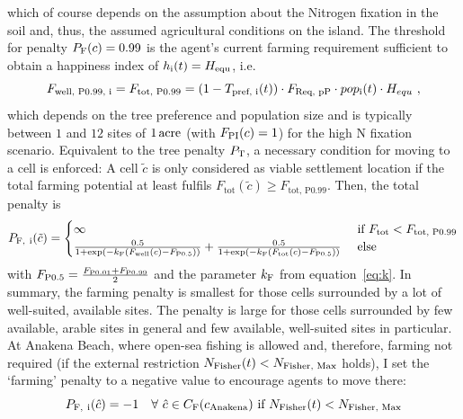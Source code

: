 which of course depends on the assumption about the Nitrogen fixation in the soil and, thus, the assumed agricultural conditions on the island.
The threshold for penalty $P_{\rm F}(c)=0.99$ is the agent's current farming requirement sufficient to obtain a happiness index of $h_{\rm i}(t) = H_{\rm equ}$, i.e.\
\begin{equation} 
F_\text{well, P0.99, i} = F_\text{tot, P0.99} = (1-T_\text{pref, i}(t))\cdot F_\text{Req, pP}\cdot pop_{\rm i}(t) \cdot H_{equ} \ , 
\end{equation}
which depends on the tree preference and population size and is typically between $1$ and $12$ sites of $1\, {\rm acre}$ (with $F_{\rm PI}(c)=1$) for the high N fixation scenario.
Equivalent to the tree penalty $P_{\rm T}$, a necessary condition for moving to a cell is enforced:
 A cell $\tilde{c}$ is only considered as viable settlement location if the total farming potential at least fulfils
 $F_\text{tot}(\tilde{c})  \geq F_\text{tot, P0.99}$.
Then, the total penalty is 
\begin{equation}
P_{\rm F, \ i} (\tilde{c}) = 
\begin{cases} 
\infty & \text{ if } F_\text{tot} < F_\text{tot, P0.99}\\
\frac{0.5}{1+\exp\left( - k_{\rm F} (F_\text{well}(c)-F_\text{P0.5}) \right)} + \frac{0.5}{1+\exp\left( - k_{\rm F} (F_\text{tot}(c)-F_\text{P0.5}) \right)} & \text{ else}
\end{cases}
\end{equation}
with $F_\text{P0.5} = \frac{F_{\rm P0.01}+F_{\rm P0.99}}{2}$ and the parameter $k_{\rm F}$ from equation~\ref{eq:k}.
In summary, the farming penalty is smallest for those cells surrounded by a lot of well-suited, available sites.
The penalty is large for those cells surrounded by few available, arable sites in general and few available, well-suited sites in particular.
At Anakena Beach, where open-sea fishing is allowed and, therefore, farming not required (if the external restriction $N_{\rm Fisher}(t)<N_\text{Fisher, Max}$ holds), I set the `farming' penalty to a negative value to encourage agents to move there:
\begin{equation}
	P_{\rm F, \ i}(\hat{c}) = - 1 %
	 \quad \forall \  \hat{c} \in C_\text{F}(c_{\rm Anakena}) \text{ if }N_{\rm Fisher}(t)<N_\text{Fisher, Max}
\end{equation}


